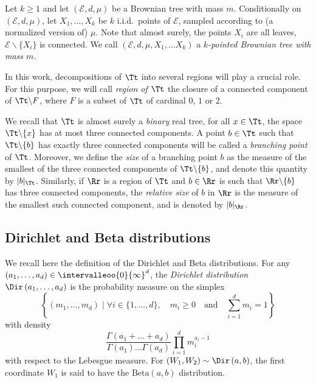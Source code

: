 Let $k \geq 1$ and let $(\mathcal{E},d,\mu)$ be a Brownian tree with mass $m$. Conditionally on $(\mathcal{E},d,\mu)$, let $X_1, \dots, X_k$ be $k$ i.i.d.\ points of $\mathcal{E}$, sampled according to (a normalized version of) $\mu$. Note that almost surely, the points $X_i$ are all leaves, \ie $\mathcal{E} \backslash \{X_i\}$ is connected. We call $(\mathcal{E},d,\mu,X_1,\dots X_k)$ a \emph{$k$-pointed Brownian tree with mass $m$}.

In this work, decompositions of $\Tt$ into several regions will play a crucial role. For this purpose, we will call \emph{region of $\Tt$} the closure of a connected component of $\Tt \backslash F$, where $F$ is a subset of $\Tt$ of cardinal $0$, $1$ or $2$.

We recall that $\Tt$ is almost surely a \emph{binary} real tree, \ie for all $x \in \Tt$, the space $\Tt \backslash \{x\}$ has at most three connected components. A point $b \in \Tt$ such that $\Tt \backslash \{ b \}$ has exactly three connected components will be called a \emph{branching point} of $\Tt$. Moreover, we define the \emph{size} of a branching point $b$ as the measure of the smallest of the three connected components of $\Tt \backslash \{b\}$, and denote this quantity by $|b|_{\Tt}$.
Similarly, if $\Rr$ is a region of $\Tt$ and $b \in \Rr$ is such that $\Rr \backslash \{b\}$ has three connected components, the \emph{relative size} of $b$ in $\Rr$ is the measure of the smallest such connected component, and is denoted by $|b|_{\Rr}$.
\subsection{Dirichlet and Beta distributions}
We recall here the definition of the Dirichlet and Beta distributions.
For any $(a_1,\dots, a_d)\in \intervalleoo{0}{\infty}^d$, the \emph{Dirichlet distribution} $\Dir \left(a_1, \dots, a_d\right)$ is the probability measure on the simplex\vspace*{-3pt}\enlargethispage{.5\baselineskip}
\[\textstyle \left\{ (m_1, \dots, m_{d}) \mid \forall i\in\{1,\dots,d\}, \quad m_i \geq 0 \quad \text{and} \quad \sum_{i=1}^{d} m_i=1 \right\}\]
with density\vspace*{-3pt}
\[ \frac{\Gamma(a_1+\dots + a_d)}{\Gamma(a_1)\dots \Gamma(a_d)} \prod_{i=1}^{d} m_i^{a_i-1} \]
with respect to the Lebesgue measure.
For $(W_1,W_2)\sim \Dir\left(a,b\right)$, the first coordinate $W_1$ is said to have the $\mathrm{Beta}(a,b)$ distribution.

